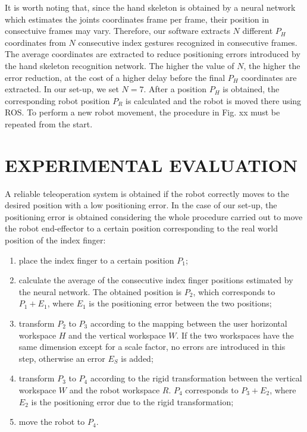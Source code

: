\documentclass[letterpaper, 10 pt, conference]{ieeeconf}  %
\begin{document}
It is worth noting that, since the hand skeleton is obtained by a neural network which estimates the joints coordinates frame per frame, their position in consectuive frames may vary. Therefore, our software extracts $N$ different $P_H$ coordinates from $N$ consecutive index gestures recognized in consecutive frames. The average coordinates are extracted to reduce positioning errors introduced by the hand skeleton recognition network. The higher the value of $N$, the higher the error reduction, at the cost of a higher delay before the final $P_H$ coordinates are extracted. In our set-up, we set $N = 7$.
After a position $P_H$ is obtained, the corresponding robot position $P_R$ is calculated and the robot is moved there using ROS.
To perform a new robot movement, the procedure in Fig. xx must be repeated from the start.

\section{EXPERIMENTAL EVALUATION}\label{sec:experiments}
A reliable teleoperation system is obtained if the robot correctly moves to the desired position with a low positioning error. In the case of our set-up, the positioning error is obtained considering the whole procedure carried out to move the robot end-effector to a certain position corresponding to the real world position of the index finger:
\begin{enumerate}
\item place the index finger to a certain position $P_1$;
\item calculate the average of the consecutive index finger positions estimated by the neural network. The obtained position is $P_2$, which corresponds to $P_1 + E_1$, where $E_1$ is the positioning error between the two positions;
\item transform $P_2$ to $P_3$ according to the mapping between the user horizontal workspace $H$ and the vertical workspace $W$. If the two workspaces have the same dimension except for a scale factor, no errors are introduced in this step, otherwise an error $E_S$ is added;
\item transform $P_3$ to $P_4$ according to the rigid transformation between the vertical workspace $W$ and the robot workspace $R$. $P_4$ corresponds to $P_3 + E_2$, where $E_2$ is the positioning error due to the rigid transformation;
\item move the robot to $P_4$.
\end{enumerate}
\end{document}
